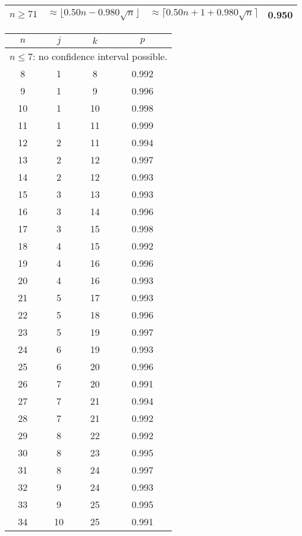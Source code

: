 \begin{table}
\begin{tabular}{|c|c|c|c|}
\hline $n \geq 71$ &
\multicolumn{1}{p{15mm}|}{$\approx \lfloor 0.50 n - 0.980 \sqrt{n}\rfloor$} &
\multicolumn{1}{p{15mm}|}{$\approx \lceil 0.50 n + 1 + 0.980 \sqrt{n}\rceil$} &
0.950 \\ \hline
\end{tabular}
 \hspace{2mm}
\hspace{2mm}
 \begin{tabular}{|c|c|c|c|}
 \hline $n$ & $j$ & $k$ & $p$ \\ \hline \hline
\multicolumn{4}{|c|}{
$n \leq 7 $: no confidence interval possible.}\\ \hline
 8  & 1  & 8 & 0.992  \\ \hline
 9  & 1  & 9 & 0.996  \\ \hline
 10  & 1  & 10 & 0.998  \\ \hline
 11  & 1  & 11 & 0.999  \\ \hline
 12  & 2  & 11 & 0.994  \\ \hline
 13  & 2  & 12 & 0.997  \\ \hline
 14  & 2  & 12 & 0.993  \\ \hline
 15  & 3  & 13 & 0.993  \\ \hline
 16  & 3  & 14 & 0.996  \\ \hline
 17  & 3  & 15 & 0.998  \\ \hline
 18  & 4  & 15 & 0.992  \\ \hline
 19  & 4  & 16 & 0.996  \\ \hline
 20  & 4  & 16 & 0.993  \\ \hline
 21  & 5  & 17 & 0.993  \\ \hline
 22  & 5  & 18 & 0.996  \\ \hline
 23  & 5  & 19 & 0.997  \\ \hline
 24  & 6  & 19 & 0.993  \\ \hline
 25  & 6  & 20 & 0.996  \\ \hline
 26  & 7  & 20 & 0.991  \\ \hline
 27  & 7  & 21 & 0.994  \\ \hline
 28  & 7  & 21 & 0.992  \\ \hline
 29  & 8  & 22 & 0.992  \\ \hline
 30  & 8  & 23 & 0.995  \\ \hline
 31  & 8  & 24 & 0.997  \\ \hline
 32  & 9  & 24 & 0.993  \\ \hline
 33  & 9  & 25 & 0.995  \\ \hline
 34  & 10  & 25 & 0.991  \\ \hline

\end{tabular}
\end{table}
